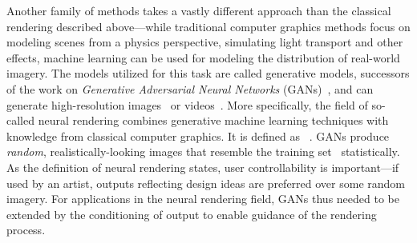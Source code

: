 Another family of methods takes a vastly different approach than the classical rendering described
above---while traditional computer graphics
methods focus on modeling scenes from a physics perspective, simulating light transport and other effects,
machine learning can be used for modeling the distribution of real-world imagery. The models utilized for this task
are called generative models, successors of the work on \emph{Generative Adversarial Neural Networks}
(GANs)~\citep{GAN}, and can generate high-resolution images~\citep{ICLR, ICLR2} or videos~\citep{VPT, CDS}.
More specifically, the field of so-called neural rendering
combines generative machine learning techniques with knowledge from classical computer
graphics. It is defined as ~\citep{SOTARendering}. GANs produce \emph{random}, realistically-looking images that resemble
the training set~\citep{DGM} statistically. As the definition of neural rendering states, user controllability
is important---if used by an artist, outputs reflecting design ideas are preferred over some random imagery.
For applications in the neural rendering field, GANs thus needed to be extended by the conditioning of output
to enable guidance of the rendering process.

